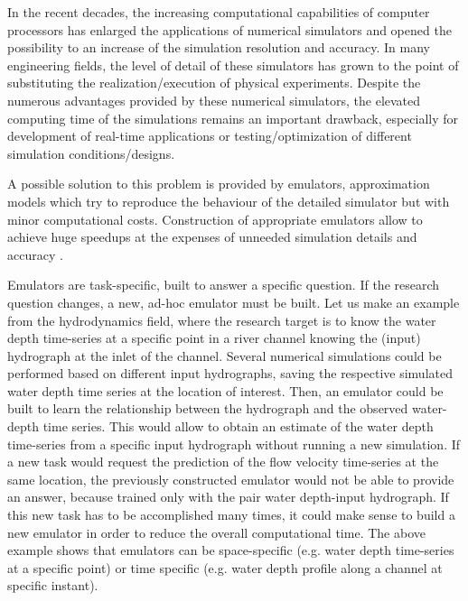 
In the recent decades, the increasing computational capabilities of computer processors has enlarged the applications of numerical simulators and opened the possibility to an increase of the simulation resolution and accuracy. In many engineering fields, the level of detail of these simulators has grown to the point of substituting the realization/execution of physical experiments. 
Despite the numerous advantages provided by these numerical simulators, the elevated computing time of the simulations remains an important drawback, especially for development of real-time applications or testing/optimization of different simulation conditions/designs.  
 
A possible solution to this problem is provided by emulators, approximation models which try to reproduce the behaviour of the detailed simulator but with minor computational costs. Construction of appropriate emulators allow to achieve huge speedups at the expenses of unneeded simulation details and accuracy \autocite{carbajal_appraisal_2016}.

Emulators are task-specific, built to answer a specific question.
If the research question changes, a new, ad-hoc emulator must be built.
Let us make an example from the hydrodynamics field, where the research target is to know the water depth time-series at a specific point in a river channel knowing the (input) hydrograph at the inlet of the channel. 
Several numerical simulations could be performed based on different input hydrographs, saving the respective simulated water depth time series at the location of interest. Then, an emulator could be built to learn the relationship between the hydrograph and the observed water-depth time series. This would allow to obtain an estimate of the water depth time-series from a specific input hydrograph without running a new simulation. 
If a new task would request the prediction of the flow velocity time-series at the same location, the previously constructed emulator would not be able to provide an answer, because trained only with the pair water depth-input hydrograph. If this new task has to be accomplished many times, it could make sense to build a new emulator in order to reduce the overall computational time.
The above example shows that emulators can be space-specific (e.g. water depth time-series at a specific point) or time specific (e.g. water depth profile along a channel at specific instant).\\

